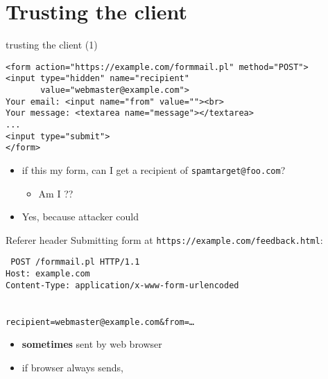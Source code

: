 
\section{Trusting the client}

\begin{frame}[fragile,label=trustCli1]{trusting the client (1)}
\begin{verbatim}
<form action="https://example.com/formmail.pl" method="POST">
<input type="hidden" name="recipient"
       value="webmaster@example.com">
Your email: <input name="from" value=""><br>
Your message: <textarea name="message"></textarea>
...
<input type="submit">
</form>
\end{verbatim}
    \begin{itemize}
        \item if this my form, can I get a recipient of \texttt{spamtarget@foo.com}?
            \begin{itemize}
                \item Am I ??
            \end{itemize}
        \item<2> Yes, because attacker could 
    \end{itemize}
\end{frame}
\begin{frame}[fragile,label=RefererHeader]{Referer header}
Submitting form at \texttt{https://example.com/feedback.html}:
\begin{framed}
\tt\small
POST /formmail.pl HTTP/1.1 \\
Host: example.com \\
Content-Type: application/x-www-form-urlencoded \\
 \\
~ \\
recipient=webmaster@example.com\&from=\ldots \\
\end{framed}
    \begin{itemize}
        \item \textbf{sometimes} sent by web browser
        \item if browser always sends, 
    \end{itemize}
\end{frame}

